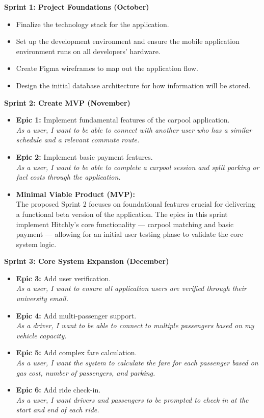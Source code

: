 \documentclass[12pt,letterpaper]{article}
\begin{document}
\textbf{Sprint 1: Project Foundations (October)}
\begin{itemize}
    \item Finalize the technology stack for the application.
    \item Set up the development environment and ensure the mobile application environment runs on all developers’ hardware.
    \item Create Figma wireframes to map out the application flow.
    \item Design the initial database architecture for how information will be stored.
\end{itemize}

\textbf{Sprint 2: Create MVP (November)}
\begin{itemize}
    \item \textbf{Epic 1:} Implement fundamental features of the carpool application. \\
    \textit{As a user, I want to be able to connect with another user who has a similar schedule and a relevant commute route.}
    
    \item \textbf{Epic 2:} Implement basic payment features. \\
    \textit{As a user, I want to be able to complete a carpool session and split parking or fuel costs through the application.}
    
    \item \textbf{Minimal Viable Product (MVP):} \\
    The proposed Sprint 2 focuses on foundational features crucial for delivering a functional beta version of the application. The epics in this sprint implement Hitchly’s core functionality — carpool matching and basic payment — allowing for an initial user testing phase to validate the core system logic.
\end{itemize}

\textbf{Sprint 3: Core System Expansion (December)}
\begin{itemize}
    \item \textbf{Epic 3:} Add user verification. \\
    \textit{As a user, I want to ensure all application users are verified through their university email.}

    \item \textbf{Epic 4:} Add multi-passenger support. \\
    \textit{As a driver, I want to be able to connect to multiple passengers based on my vehicle capacity.}

    \item \textbf{Epic 5:} Add complex fare calculation. \\
    \textit{As a user, I want the system to calculate the fare for each passenger based on gas cost, number of passengers, and parking.}

    \item \textbf{Epic 6:} Add ride check-in. \\
    \textit{As a user, I want drivers and passengers to be prompted to check in at the start and end of each ride.}
\end{itemize}
\end{document}

